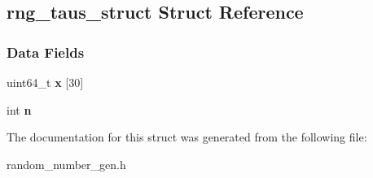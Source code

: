 \hypertarget{structrng__taus__struct}{}\subsection{rng\+\_\+taus\+\_\+struct Struct Reference}
\label{structrng__taus__struct}
\subsubsection*{Data Fields}
\begin{DoxyCompactItemize}
\item 
\mbox{\label{structrng__taus__struct_a24f685cd6bff45b43c137ff9f00baeea}} 
uint64\+\_\+t {\bfseries x} \mbox{[}30\mbox{]}
\item 
\mbox{\label{structrng__taus__struct_a32c71f11d3efcf34680577387e8faf15}} 
int {\bfseries n}
\end{DoxyCompactItemize}


The documentation for this struct was generated from the following file\+:\begin{DoxyCompactItemize}
\item 
random\+\_\+number\+\_\+gen.\+h\end{DoxyCompactItemize}
